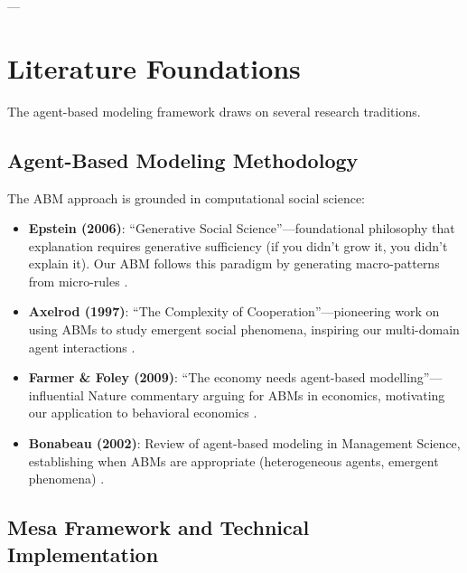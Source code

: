 ---


\section{Literature Foundations}
\label{ppp:literature}

The agent-based modeling framework draws on several research traditions.

\subsection{Agent-Based Modeling Methodology}

The ABM approach is grounded in computational social science:

\begin{itemize}
\item \textbf{Epstein (2006)}: ``Generative Social Science''---foundational philosophy that
      explanation requires generative sufficiency (if you didn't grow it, you didn't explain it).
      Our ABM follows this paradigm by generating macro-patterns from micro-rules
      \citep{epstein2006generative}.

\item \textbf{Axelrod (1997)}: ``The Complexity of Cooperation''---pioneering work on
      using ABMs to study emergent social phenomena, inspiring our multi-domain
      agent interactions \citep{axelrod1997complexity}.

\item \textbf{Farmer \& Foley (2009)}: ``The economy needs agent-based modelling''---
      influential Nature commentary arguing for ABMs in economics, motivating our
      application to behavioral economics \citep{farmer2009economy}.

\item \textbf{Bonabeau (2002)}: Review of agent-based modeling in Management Science,
      establishing when ABMs are appropriate (heterogeneous agents, emergent phenomena)
      \citep{bonabeau2002agent}.
\end{itemize}

\subsection{Mesa Framework and Technical Implementation}

